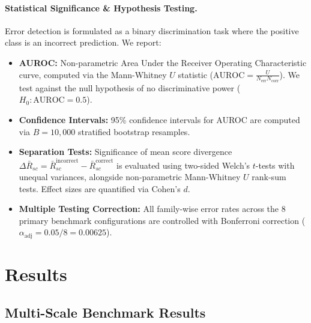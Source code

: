 \documentclass[11pt]{article}
\begin{document}
\paragraph{Statistical Significance \& Hypothesis Testing.} Error detection is formulated as a binary discrimination task where the positive class is an incorrect prediction. We report:
\begin{itemize}
    \item \textbf{AUROC:} Non-parametric Area Under the Receiver Operating Characteristic curve, computed via the Mann-Whitney $U$ statistic ($\text{AUROC} = \frac{U}{N_{\text{err}} N_{\text{corr}}}$). We test against the null hypothesis of no discriminative power ($H_0: \text{AUROC} = 0.5$).
    \item \textbf{Confidence Intervals:} 95\% confidence intervals for AUROC are computed via $B = 10{,}000$ stratified bootstrap resamples.
    \item \textbf{Separation Tests:} Significance of mean score divergence $\Delta\bar{R}_{sc} = \bar{R}_{sc}^{\text{incorrect}} - \bar{R}_{sc}^{\text{correct}}$ is evaluated using two-sided Welch's $t$-tests with unequal variances, alongside non-parametric Mann-Whitney $U$ rank-sum tests. Effect sizes are quantified via Cohen's $d$.
    \item \textbf{Multiple Testing Correction:} All family-wise error rates across the 8 primary benchmark configurations are controlled with Bonferroni correction ($\alpha_{\text{adj}} = 0.05 / 8 = 0.00625$).
\end{itemize}

\section{Results}

\subsection{Multi-Scale Benchmark Results}
\end{document}
